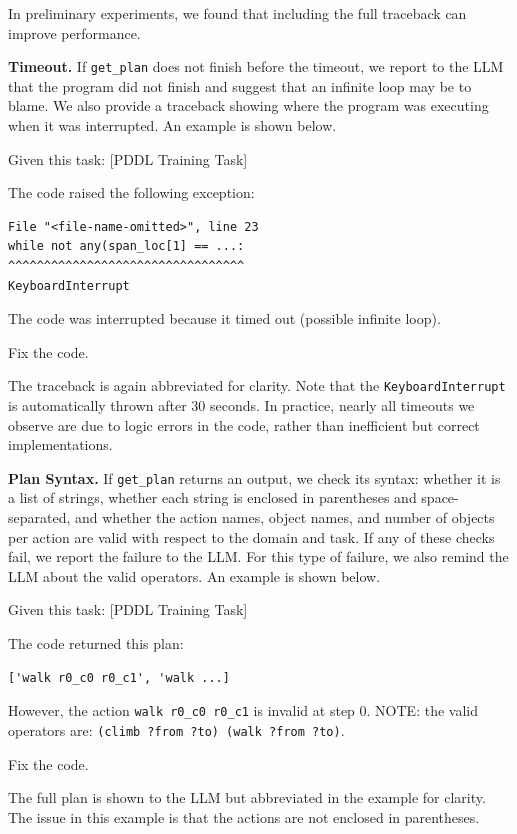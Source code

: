 \documentclass[letterpaper]{article} %
\begin{document}
In preliminary experiments, we found that including the full traceback can improve performance.

\textbf{Timeout.} If \texttt{get\_plan} does not finish before the timeout, we report to the LLM that the program did not finish and suggest that an infinite loop may be to blame.
We also provide a traceback showing where the program was executing when it was interrupted.
An example is shown below.

\begin{tcolorbox}[left=2pt,right=2pt]
Given this task: [PDDL Training Task]

The code raised the following exception:
\begin{verbatim}
File "<file-name-omitted>", line 23
while not any(span_loc[1] == ...:
^^^^^^^^^^^^^^^^^^^^^^^^^^^^^^^^^
KeyboardInterrupt
\end{verbatim}
The code was interrupted because it timed out (possible infinite loop).

Fix the code.
\end{tcolorbox}

The traceback is again abbreviated for clarity.
Note that the \texttt{KeyboardInterrupt} is automatically thrown after 30 seconds.
In practice, nearly all timeouts we observe are due to logic errors in the code, rather than inefficient but correct implementations.

\textbf{Plan Syntax.} If \texttt{get\_plan} returns an output, we check its syntax: whether it is a list of strings, whether each string is enclosed in parentheses and space-separated, and whether the action names, object names, and number of objects per action are valid with respect to the domain and task.
If any of these checks fail, we report the failure to the LLM.
For this type of failure, we also remind the LLM about the valid operators.
An example is shown below.

\begin{tcolorbox}[left=2pt,right=2pt]
Given this task: [PDDL Training Task]

The code returned this plan: 
\begin{verbatim}
['walk r0_c0 r0_c1', 'walk ...]
\end{verbatim}
However, the action \texttt{walk r0\_c0 r0\_c1} is invalid at step 0. NOTE: the valid operators are: \texttt{(climb ?from ?to) (walk ?from ?to)}.

Fix the code.
\end{tcolorbox}

The full plan is shown to the LLM but abbreviated in the example for clarity.
The issue in this example is that the actions are not enclosed in parentheses.
\end{document}
